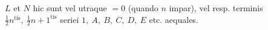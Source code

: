 \(L\) et \(N\) hic sunt vel utraque \(=0\) (quando \(n\) impar), vel resp. terminis \(\frac12n^{\mathrm{tis}},\ \frac12n+1^{\mathrm{tis}}\) seriei
\(1,\ A,\ B,\ C,\ D,\ E\) etc. aequales.